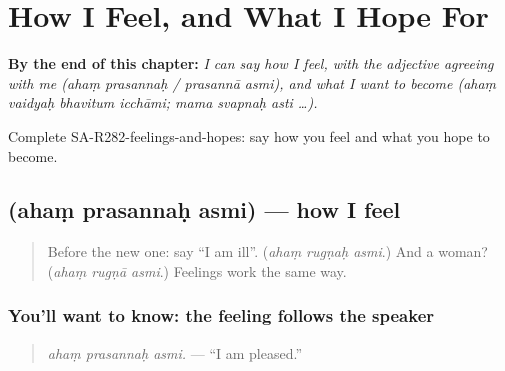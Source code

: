
\chapter{How I Feel, and What I Hope For}
\label{ch:sa-how-i-feel-and-what-i-hope-for}

\begin{chapteropening}
\textbf{By the end of this chapter:} \emph{I can say how I feel, with the adjective agreeing with me (ahaṃ prasannaḥ / prasannā asmi), and what I want to become (ahaṃ vaidyaḥ bhavitum icchāmi; mama svapnaḥ asti …).}

Complete SA-R282-feelings-and-hopes: say how you feel and what you hope to become.
\end{chapteropening}

\section[\texorpdfstring{\sk{अहं} \sk{प्रसन्नः} \sk{अस्मि} (ahaṃ prasannaḥ asmi)}{अहं प्रसन्नः अस्मि (ahaṃ prasannaḥ asmi)}]{   (ahaṃ prasannaḥ asmi) — how I feel}

\label{lesson:SA-C282-aham-prasannah-asmi}



\begin{quote}
Before the new one: say \textquotedblleft{}I am ill\textquotedblright{}. (\emph{ahaṃ rugṇaḥ asmi}.) And a woman? (\emph{ahaṃ rugṇā asmi}.) Feelings work the same way.
\end{quote}

\subsection*{You'll want to know: the feeling follows the speaker}
\begin{quote}
\textbf{  }
\end{quote}

\begin{quote}
\emph{ahaṃ prasannaḥ asmi.} — \textquotedblleft{}I am pleased.\textquotedblright{}
\end{quote}

\begin{quote}
\textbf{  }
\end{quote}

